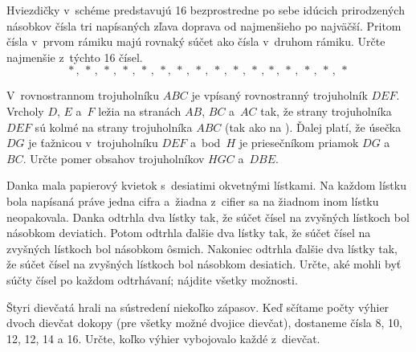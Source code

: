 {%
Hviezdičky v~schéme predstavujú 16 bezprostredne po sebe idúcich
prirodzených násobkov čísla tri
napísaných zľava doprava od najmenšieho po najväčší.
Pritom čísla v~prvom rámiku majú rovnaký súčet ako čísla v~druhom rámiku.
Určte najmenšie z~týchto 16 čísel.
$$
\boxed{*\,,\ *\,,\ *\,,\ *\,,\ *\,,\ *},\ *\,,\ *\,,\ *\,,\ *\,,\ *\,,\ \boxed{*\,,\ *\,,\ *\,,\ *\,,\ *}
$$
}

{%
V~rovnostrannom trojuholníku $ABC$ je vpísaný rovnostranný trojuholník
$DEF$.
Vrcholy $D$, $E$ a~$F$ ležia na stranách $AB$, $BC$ a~$AC$ tak, že strany
trojuholníka $DEF$ sú kolmé na strany trojuholníka $ABC$ (tak ako na \obr).
Ďalej platí, že úsečka $DG$ je ťažnicou v~trojuholníku $DEF$ a~bod~$H$ je
priesečníkom priamok $DG$ a~$BC$.
Určte pomer obsahov trojuholníkov $HGC$ a~$DBE$.
\ifobrazkyvedla\else{}\fi
}

{%
Danka mala papierový kvietok s~desiatimi okvetnými lístkami.
Na každom lístku bola napísaná práve jedna cifra a~žiadna z~cifier sa
na žiadnom inom lístku neopakovala.
Danka odtrhla dva lístky tak, že súčet čísel na zvyšných lístkoch bol
násobkom deviatich.
Potom odtrhla ďalšie dva lístky tak, že súčet čísel na zvyšných lístkoch
bol násobkom ôsmich.
Nakoniec odtrhla ďalšie dva lístky tak, že súčet čísel na zvyšných
lístkoch bol násobkom desiatich.
Určte, aké mohli byť súčty čísel po každom odtrhávaní; nájdite všetky
možnosti.}

{%
Štyri dievčatá hrali na sústredení niekoľko zápasov.
Keď sčítame počty výhier dvoch dievčat dokopy (pre všetky možné dvojice dievčat), dostaneme čísla
8, 10, 12, 12, 14 a 16.
Určte, koľko výhier vybojovalo každé z~dievčat.}

